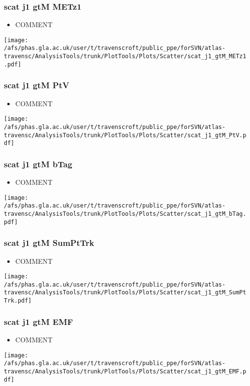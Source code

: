 \documentclass{beamer}
\begin{document}
\begin{frame}
\frametitle{scat j1 gtM METz1}
\begin{itemize}
\item COMMENT
\end{itemize}
\begin{center}
\texttt{[image: /afs/phas.gla.ac.uk/user/t/travenscroft/public\_ppe/forSVN/atlas-travensc/AnalysisTools/trunk/PlotTools/Plots/Scatter/scat\_j1\_gtM\_METz1.pdf]}
\end{center}
\end{frame}

\begin{frame}
\frametitle{scat j1 gtM PtV}
\begin{itemize}
\item COMMENT
\end{itemize}
\begin{center}
\texttt{[image: /afs/phas.gla.ac.uk/user/t/travenscroft/public\_ppe/forSVN/atlas-travensc/AnalysisTools/trunk/PlotTools/Plots/Scatter/scat\_j1\_gtM\_PtV.pdf]}
\end{center}
\end{frame}

\begin{frame}
\frametitle{scat j1 gtM bTag}
\begin{itemize}
\item COMMENT
\end{itemize}
\begin{center}
\texttt{[image: /afs/phas.gla.ac.uk/user/t/travenscroft/public\_ppe/forSVN/atlas-travensc/AnalysisTools/trunk/PlotTools/Plots/Scatter/scat\_j1\_gtM\_bTag.pdf]}
\end{center}
\end{frame}

\begin{frame}
\frametitle{scat j1 gtM SumPtTrk}
\begin{itemize}
\item COMMENT
\end{itemize}
\begin{center}
\texttt{[image: /afs/phas.gla.ac.uk/user/t/travenscroft/public\_ppe/forSVN/atlas-travensc/AnalysisTools/trunk/PlotTools/Plots/Scatter/scat\_j1\_gtM\_SumPtTrk.pdf]}
\end{center}
\end{frame}

\begin{frame}
\frametitle{scat j1 gtM EMF}
\begin{itemize}
\item COMMENT
\end{itemize}
\begin{center}
\texttt{[image: /afs/phas.gla.ac.uk/user/t/travenscroft/public\_ppe/forSVN/atlas-travensc/AnalysisTools/trunk/PlotTools/Plots/Scatter/scat\_j1\_gtM\_EMF.pdf]}
\end{center}
\end{frame}
\end{document}
